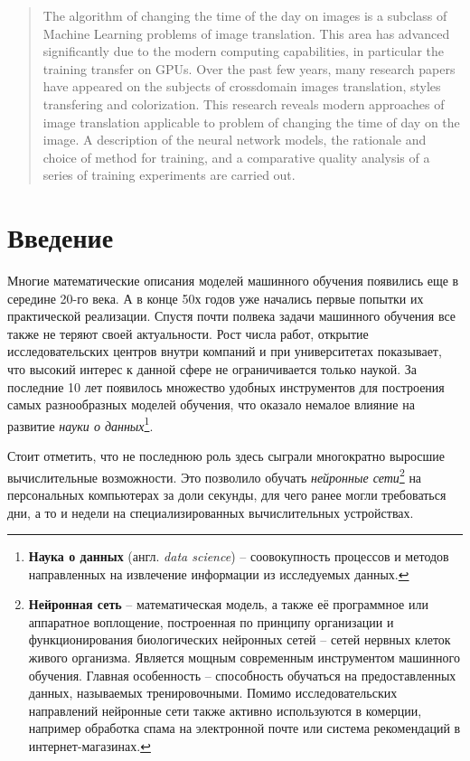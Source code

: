 \documentclass[11pt,a4paper]{extarticle}
\begin{document}
\begin{abstract}
	The algorithm of changing the time of the day on images is a subclass of Machine Learning problems of image translation.
	This area has advanced significantly due to the modern computing capabilities, in particular the training transfer on GPUs.
	Over the past few years, many research papers have appeared on the subjects of crossdomain images translation, styles transfering and colorization.
	This research reveals modern approaches of image translation applicable to problem of changing the time of day on the image.
	A description of the neural network models, the rationale and choice of method for training, and a comparative quality analysis of a series of training experiments are carried out.
\end{abstract}

\newpage
\tableofcontents
\newpage

\section{Введение}

	Многие математические описания моделей машинного обучения появились еще в середине 20-го века.
	А в конце 50х годов уже начались первые попытки их практической реализации.
	Спустя почти полвека задачи машинного обучения все также не теряют своей актуальности.
	Рост числа работ, открытие исследовательских центров внутри компаний и при университетах показывает,
	что высокий интерес к данной сфере не ограничивается только наукой.
	За последние 10 лет появилось множество удобных инструментов для построения самых разнообразных моделей обучения, что оказало немалое влияние на развитие \textit{науки о данных}\footnote{
		\textbf{Наука о данных} (англ. \textit{data science}) -- соовокупность процессов и методов направленных на извлечение информации из исследуемых данных.
	}.  
	
	Стоит отметить, что не последнюю роль здесь сыграли многократно выросшие вычислительные возможности. 
	Это позволило обучать \textit{нейронные сети}\footnote{
		\textbf{Нейронная сеть} --  математическая модель, а также её программное или аппаратное воплощение, 
		построенная по принципу организации и функционирования биологических нейронных сетей -- сетей нервных клеток живого организма.
		Является мощным современным инструментом машинного обучения.
		Главная особенность -- способность обучаться на предоставленных данных, называемых тренировочными.
		Помимо исследовательских направлений нейронные сети также активно используются в комерции, например обработка спама на электронной почте или система рекомендаций в интернет-магазинах.
	} на персональных компьютерах за доли секунды, для чего ранее могли требоваться дни, а то и недели на специализированных вычислительных устройствах.
\end{document}
